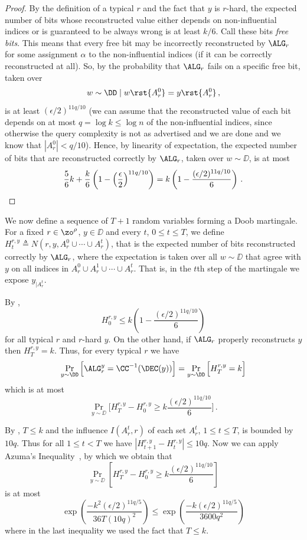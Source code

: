 \begin{proof} By the definition of a typical $r$ and the fact that $y$ is $r$-hard,
the expected number of bits whose reconstructed value either depends
on non-influential indices or is guaranteed to be always wrong is at
least $k/6$. Call these bits \emph{free bits}. This means that every
free bit may be incorrectly reconstructed by $\ALG_r$ for some
assignment $\alpha$ to the non-influential indices (if it can be
correctly reconstructed at all). So, by  the
probability that $\ALG_r$ fails on a specific free bit, taken over
\[
w \sim \DD \mid w\rst{A_r^0} = y\rst{A_r^0}\,,
\]
is at least $(\epsilon/2)^{11q/10}$ (we can assume that the reconstructed value of each bit depends on at most $q = \log k \leq \log n$ of the non-influential indices, since otherwise the query complexity is not as advertised and we are done and we know that $|A_r^0|< q/10$). Hence, by linearity of expectation, the expected number of bits that are reconstructed correctly by $\ALG_r$, taken over $w \sim \DD$, is at most
\[
\frac{5}{6}k + \frac{k}{6}\left(1-\left(\frac{\epsilon}{2}\right)^{11q/10}\right)
= k\left(1-\frac{(\epsilon/2)^{11q/10}}{6}\right)\,.\qedhere
\]
\end{proof}

We now define a sequence of $T + 1$ random variables forming a Doob martingale. For a fixed $r \in \zo^\rho$, $y \in \DD$ and every $t$, $0 \leq t \leq T$, we define $H^{r,y}_t \triangleq N(r,y, A_r^0 \cup \cdots \cup A_r^t)$, that is the expected number of bits reconstructed correctly by $\ALG_r$, where the expectation is taken over all $w \sim \DD$ that agree with $y$ on all indices in $A_r^0 \cup A_r^1 \cup \cdots \cup A_r^t$. That is, in the $t$th step of the martingale we expose $y_{|A_r^t}$.

By ,
\[
H^{r,y}_0 \leq k\left(1-\frac{(\epsilon/2)^{11q/10}}{6}\right)
\]
for all typical $r$ and $r$-hard $y$. On the other hand, if $\ALG_r$ properly reconstructs $y$ then $H^{r,y}_T=k$. Thus, for every typical $r$ we have
\[
\Pr_{y \sim \DD}\Big[\ALG^y_r = \CC^{-1}(\DEC(y))\Big] = \Pr_{y \sim
  \DD}\Big[H^{r,y}_T = k\Big]
\]
which is at most
\[
\Pr_{y \sim
  \DD}\Big[H^{r,y}_T - H^{r,y}_0 \geq k
\frac{(\epsilon/2)^{11q/10}}{6}\Big]\,.
\]




By , $T \leq k$ and the influence $I(A_r^t,r)$ of each set $A_r^t$, $1 \leq t \leq T$, is bounded by $10q$. Thus for all $1 \leq t < T$ we have $|H^{r,y}_{t+1} - H^{r,y}_{t}| \leq 10q$. Now we can apply Azuma's Inequality~\cite{alon}, by which we obtain that $$\Pr_{y \sim \DD}\left[H^{r,y}_{T} - H^{r,y}_0 \geq k \frac{(\epsilon/2)^{11q/10}}{6} \right]$$ is at most
$$\exp\left(\frac{-k^2(\epsilon/2)^{11q/5}}{36 T (10q)^2}\right) \leq \exp\left(\frac{-k(\epsilon/2)^{11q/5}}{3600 q^2}\right)$$ where in the last inequality we used the fact that $T \leq k$.



